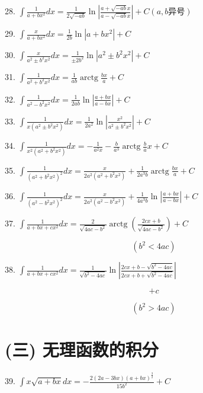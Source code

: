\documentclass[lang=cn,newtx,10pt,scheme=chinese]{elegantbook}
\begin{document}
28. \(\int \frac{1}{a + b{x}^{2}}{dx} = \frac{1}{2\sqrt{-{ab}}}\ln \left| \frac{a + \sqrt{-{ab}}x}{a - \sqrt{-{ab}}x}\right| + C\left( {a,b\text{异号}}\right)\)

29. \(\int \frac{x}{a + b{x}^{2}}{dx} = \frac{1}{2b}\ln \left| {a + b{x}^{2}}\right| + C\)

30. \(\int \frac{x}{{a}^{2} \pm {b}^{2}{x}^{2}}{dx} = \frac{1}{\pm 2{b}^{2}}\ln \left| {{a}^{2} \pm {b}^{2}{x}^{2}}\right| + C\)

31. \(\int \frac{1}{{a}^{2} + {b}^{2}{x}^{2}}{dx} = \frac{1}{ab}\operatorname{arctg}\frac{bx}{a} + C\)

32. \(\int \frac{1}{{a}^{2} - {b}^{2}{x}^{2}}{dx} = \frac{1}{2ab}\ln \left| \frac{a + {bx}}{a - {bx}}\right| + C\)

33. \(\int \frac{1}{x\left( {{a}^{2} \pm {b}^{2}{x}^{2}}\right) }{dx} = \frac{1}{2{a}^{2}}\ln \left| \frac{{x}^{2}}{{a}^{2} \pm {b}^{2}{x}^{2}}\right| + C\)

34. \(\int \frac{1}{{x}^{2}\left( {{a}^{2} + {b}^{2}{x}^{2}}\right) }{dx} = - \frac{1}{{a}^{2}x} - \frac{b}{{a}^{3}}\operatorname{arctg}\frac{b}{a}x + C\)

35. \(\int \frac{1}{{\left( {a}^{2} + {b}^{2}{x}^{2}\right) }^{2}}{dx} = \frac{x}{2{a}^{2}\left( {{a}^{2} + {b}^{2}{x}^{2}}\right) } + \frac{1}{2{a}^{3}b}\operatorname{arctg}\frac{bx}{a} + C\)

36. \(\int \frac{1}{{\left( {a}^{2} - {b}^{2}{x}^{2}\right) }^{2}}{dx} = \frac{x}{2{a}^{2}\left( {{a}^{2} - {b}^{2}{x}^{2}}\right) } + \frac{1}{4{a}^{3}b}\ln \left| \frac{a + {bx}}{a - {bx}}\right| + C\)

37. \(\int \frac{1}{a + {bx} + c{x}^{2}}{dx} = \frac{2}{\sqrt{{4ac} - {b}^{2}}}\operatorname{arctg}\left( \frac{{2cx} + b}{\sqrt{{4ac} - {b}^{2}}}\right) + C\)

\[
\left( {{b}^{2} < {4ac}}\right)
\]

38. \(\int \frac{1}{a + {bx} + c{x}^{2}}{dx} = \frac{1}{\sqrt{{b}^{2} - {4ac}}}\ln \left| \frac{{2cx} + b - \sqrt{{b}^{2} - {4ac}}}{{2cx} + b + \sqrt{{b}^{2} - {4ac}}}\right|\)

\[
+ c
\]

\[
\left( {{b}^{2} > {4ac}}\right)
\]

\section*{(三) 无理函数的积分}

39. \(\int x\sqrt{a + {bx}}{dx} = - \frac{2\left( {{2a} - {3bx}}\right) {\left( a + bx\right) }^{\frac{3}{2}}}{{15}{b}^{2}} + C\)
\end{document}
